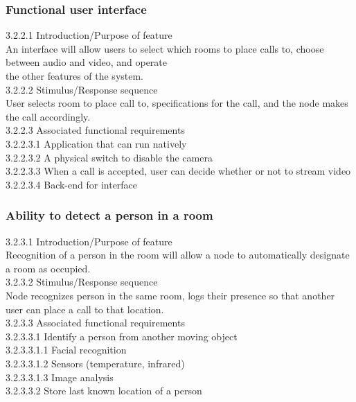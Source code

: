 \documentclass[onecolumn, draftclsnofoot,10pt, compsoc]{IEEEtran}
\newcommand\tab[1][1cm]{\hspace*{#1}}
\begin{document}
\subsubsection{Functional user interface}
\tab 3.2.2.1  Introduction/Purpose of feature \\
\tab An interface will allow users to select which rooms to place calls to, choose between audio and video, and operate \\ \tab the other features of the system. \\
\tab 3.2.2.2  Stimulus/Response sequence \\
\tab User selects room to place call to, specifications for the call, and the node makes the call accordingly. \\
\tab 3.2.2.3  Associated functional requirements \\
\tab \tab 3.2.2.3.1  Application that can run natively \\
\tab \tab 3.2.2.3.2  A physical switch to disable the camera \\
\tab \tab 3.2.2.3.3  When a call is accepted, user can decide whether or not to stream video \\ 
\tab \tab 3.2.2.3.4  Back-end for interface 

\subsubsection{Ability to detect a person in a room}
\tab 3.2.3.1  Introduction/Purpose of feature \\
\tab Recognition of a person in the room will allow a node to automatically designate a room as occupied. \\
\tab 3.2.3.2  Stimulus/Response sequence \\
\tab Node recognizes person in the same room, logs their presence so that another user can place a call to that location. \\
\tab 3.2.3.3  Associated functional requirements \\
\tab \tab 3.2.3.3.1  Identify a person from another moving object \\
\tab \tab \tab 3.2.3.3.1.1  Facial recognition \\
\tab \tab \tab 3.2.3.3.1.2  Sensors (temperature, infrared) \\
\tab \tab \tab 3.2.3.3.1.3  Image analysis \\ 
\tab \tab 3.2.3.3.2  Store last known location of a person
\end{document}
